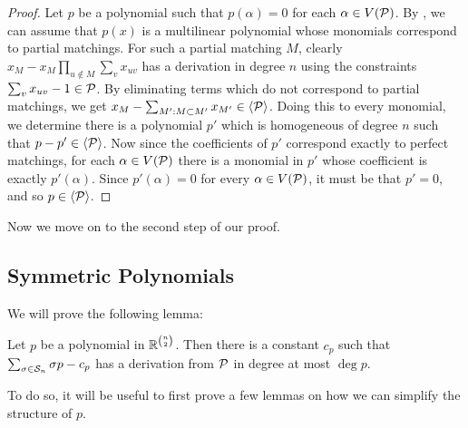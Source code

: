 \begin{proof}
Let $p$ be a polynomial such that $p(\alpha) = 0$ for each $\alpha \in V(\mathcal P)$. By , we can assume that $p(x)$ is a multilinear polynomial whose monomials correspond to partial matchings. For such a partial matching $M$, clearly $x_M - x_M\prod_{u \notin M} \sum_v x_{uv}$ has a derivation in degree $n$ using the constraints $\sum_v x_{uv} - 1 \in \mathcal P$. By eliminating terms which do not correspond to partial matchings, we get $x_M - \sum_{M': M \subset M'} x_{M'} \in \langle \mathcal P \rangle$. Doing this to every monomial, we determine there is a polynomial $p'$ which is homogeneous of degree $n$ such that $p - p' \in \langle \mathcal P \rangle$. Now since the coefficients of $p'$ correspond exactly to perfect matchings, for each $\alpha \in V(\mathcal P)$ there is a monomial in $p'$ whose coefficient is exactly $p'(\alpha)$. Since $p'(\alpha) = 0$ for every $\alpha \in V(\mathcal P)$, it must be that $p' = 0$, and so $p \in \langle \mathcal P \rangle$.
\end{proof}
Now we move on to the second step of our proof. 

\subsection{Symmetric Polynomials}

We will prove the following lemma: 
\begin{lemma}
  \label{lem:constant}
  Let $p$ be a polynomial in $\mathbb R^{\binom{n}{2}}$.
	Then there is a constant $c_p$ such that $\sum_{\sigma \in \mathcal S_n} \sigma p - c_p$ has a derivation from $\mathcal P$ in degree at most $\deg p$. 
\end{lemma}
To do so, it will be useful to first prove a few lemmas on how we can simplify the structure of $p$. 

